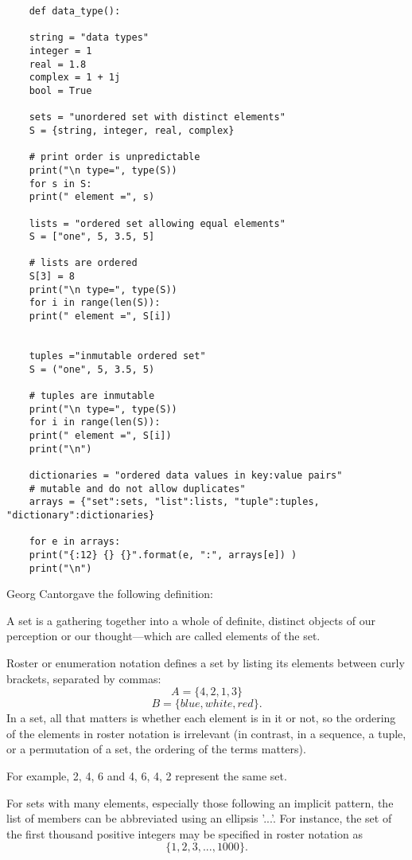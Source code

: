 \begin{verbatim}
    def data_type(): 
    
    string = "data types"
    integer = 1 
    real = 1.8 
    complex = 1 + 1j
    bool = True
    
    sets = "unordered set with distinct elements" 
    S = {string, integer, real, complex} 
    
    # print order is unpredictable 
    print("\n type=", type(S)) 
    for s in S: 
    print(" element =", s)
    
    lists = "ordered set allowing equal elements" 
    S = ["one", 5, 3.5, 5] 
    
    # lists are ordered  
    S[3] = 8
    print("\n type=", type(S))   
    for i in range(len(S)): 
    print(" element =", S[i]) 
    
    
    tuples ="inmutable ordered set" 
    S = ("one", 5, 3.5, 5)  
    
    # tuples are inmutable 
    print("\n type=", type(S))
    for i in range(len(S)): 
    print(" element =", S[i])   
    print("\n")   
    
    dictionaries = "ordered data values in key:value pairs"
    # mutable and do not allow duplicates"
    arrays = {"set":sets, "list":lists, "tuple":tuples, "dictionary":dictionaries} 
    
    for e in arrays:  
    print("{:12} {} {}".format(e, ":", arrays[e]) )
    print("\n")
\end{verbatim}







Georg Cantorgave the following definition: 

A set is a gathering together into a whole of definite, distinct objects of our perception or our thought—which are called elements of the 
set.

Roster or enumeration notation defines a set by listing
its elements between curly brackets, separated by commas:
$$
A = \{ 4, 2, 1, 3 \}
$$
$$
B = \{ blue, white, red \}.
$$
In a set, all that matters is whether each element is in it or not, 
so the ordering of the elements in roster notation is irrelevant 
(in contrast, in a sequence, a tuple, or a permutation of a set, 
the ordering of the terms matters).

 
For example, {2, 4, 6} and {4, 6, 4, 2} represent the same set.

For sets with many elements, especially those following an implicit pattern,
the list of members can be abbreviated using an ellipsis '...'.
For instance, the set of the first thousand positive integers 
may be specified in roster notation as
$$
\{ 1, 2, 3, ..., 1000 \}.
$$



